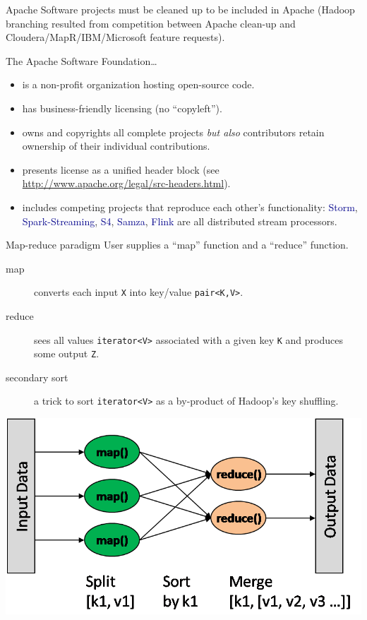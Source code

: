 \documentclass{beamer}
\begin{document}
\begin{frame}{Apache}
Software projects must be cleaned up to be included in Apache (Hadoop branching resulted from competition between Apache clean-up and Cloudera/MapR/IBM/Microsoft feature requests).

\vfill
The Apache Software Foundation\ldots
\begin{itemize}
\item is a non-profit organization hosting open-source code.
\item has business-friendly licensing (no ``copyleft'').
\item owns and copyrights all complete projects {\it but also} contributors retain ownership of their individual contributions.
\item presents license as a unified header block (see \url{http://www.apache.org/legal/src-headers.html}).
\item includes competing projects that reproduce each other's functionality: \textcolor{darkblue}{Storm}, \textcolor{darkblue}{Spark-Streaming}, \textcolor{darkblue}{S4}, \textcolor{darkblue}{Samza}, \textcolor{darkblue}{Flink} are all distributed stream processors.
\end{itemize}
\end{frame}

\begin{frame}{Map-reduce paradigm}
User supplies a ``map'' function and a ``reduce'' function.
\begin{description}
\item[map] converts each input {\tt X} into key/value {\tt pair<K,V>}.
\item[reduce] sees all values {\tt iterator<V>} associated with a given key {\tt K} and produces some output {\tt Z}.
\item[secondary sort] a trick to sort {\tt iterator<V>} as a by-product of Hadoop's key shuffling.
\end{description}

\begin{center}
\includegraphics[width=0.65\linewidth]{map-reduce.png}
\end{center}
\end{frame}
\end{document}
